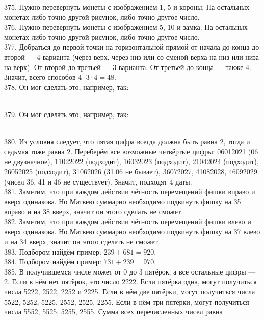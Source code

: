 375. Нужно перевернуть монеты с изображением 1, 5 и короны. На остальных монетах либо точно другой рисунок, либо точно другое число.\\
376. Нужно перевернуть монеты с изображением 5, 10 и замка. На остальных монетах либо точно другой рисунок, либо точно другое число.\\
377. Добраться до первой точки на горизонтальной прямой от начала до конца до второй --- 4 варианта (через верх, через низ или со сменой верха на низ или низа на верх). От второй до третьей --- 3 варианта. От третьей до конца --- также 4. Значит, всего способов $4\cdot3\cdot4=48.$\\
378. Он мог сделать это, например, так:
\begin{figure}[ht!]
\end{figure}\\
379. Он мог сделать это, например, так:
\begin{figure}[ht!]
\end{figure}\\
380. Из условия следует, что пятая цифра всегда должна быть равна 2, тогда и седьмая тоже равна 2. Переберём все возможные четвёртые цифры: 06012021 (06 не двузначное), 11022022 (подходит), 16032023 (подходит), 21042024 (подходит), 26052025 (подходит), 31062026 (31.06 не бывает), 36072027, 41082028, 46092029 (чисел 36, 41 и 46 не существует). Значит, подходят 4 даты.\\
381. Заметим, что при каждом действии чётность перемещений фишки вправо и вверх одинакова. Но Матвею суммарно необходимо подвинуть фишку на 35 вправо и на 38 вверх, значит он этого сделать не сможет.\\
382. Заметим, что при каждом действии чётность перемещений фишки влево и вверх одинакова. Но Матвею суммарно необходимо подвинуть фишку на 37 влево и на 34 вверх, значит он этого сделать не сможет.\\
383. Подбором найдём пример: $239+681=920.$\\
384. Подбором найдём пример: $731+239=970.$\\
385. В получившемся числе может от 0 до 3 пятёрок, а все остальные цифры --- 2. Если в нём нет пятёрок, это число 2222. Если пятёрка одна, могут получиться числа 5222, 2522, 2252 и 2225. Если в нём две пятёрки, могут получиться числа 5522, 5252, 5225, 2552, 2525, 2255. Если в нём три пятёрки, могут получиться числа 5552, 5525, 5255, 2555. Сумма всех перечисленных чисел равна
